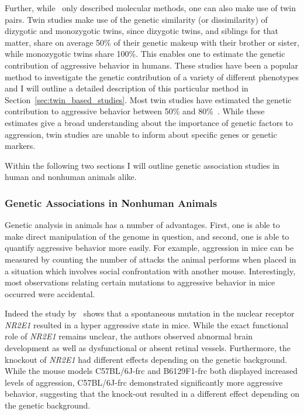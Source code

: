 Further, while~\citet{Maxson2005} only described molecular methods, one can also make use of twin pairs.
Twin studies make use of the genetic similarity (or dissimilarity) of dizygotic and monozygotic twins, since dizygotic twins, and siblings for that matter, share on average 50\% of their genetic makeup with their brother or sister, while monozygotic twins share 100\%.
This enables one to estimate the genetic contribution of aggressive behavior in humans.
These studies have been a popular method to investigate the genetic contribution of a variety of different phenotypes and I will outline a detailed description of this particular method in Section~\ref{sec:twin_based_studies}. 
Most twin studies have estimated the genetic contribution to aggressive behavior between 50\% and 80\%~\cite{Porsch2016}.
While these estimates give a broad understanding about the importance of genetic factors  to aggression, twin studies are unable to inform about specific genes or genetic markers.

Within the following two sections I will outline genetic association studies in human and nonhuman animals alike.

\subsubsection{Genetic Associations in Nonhuman Animals}
\label{ssub:genetic_associations_in_animals}

Genetic analysis in animals has a number of advantages.
First, one is able to make direct manipulation of the genome in question, and second, one is able to quantify aggressive behavior more easily.
For example, aggression in mice can be measured by counting the number of attacks the animal performs when placed in a situation which involves social confrontation with another mouse.
Interestingly, most observations relating certain mutations to aggressive behavior in mice occurred were accidental.  

Indeed the study by~\cite{Young2002} shows that a spontaneous mutation in the nuclear receptor \textit{NR2E1} resulted in a hyper aggressive state in mice.
While the exact functional role of \textit{NR2E1} remains unclear, the authors observed abnormal brain development as well as dysfunctional or absent retinal vessels.
Furthermore, the knockout of \textit{NR2E1} had different effects depending on the genetic background.
While the mouse models C57BL/6J-frc and B6129F1-frc both displayed increased levels of aggression, C57BL/6J-frc demonstrated significantly more aggressive behavior,
 suggesting that the knock-out resulted in a different effect depending on the genetic background.

